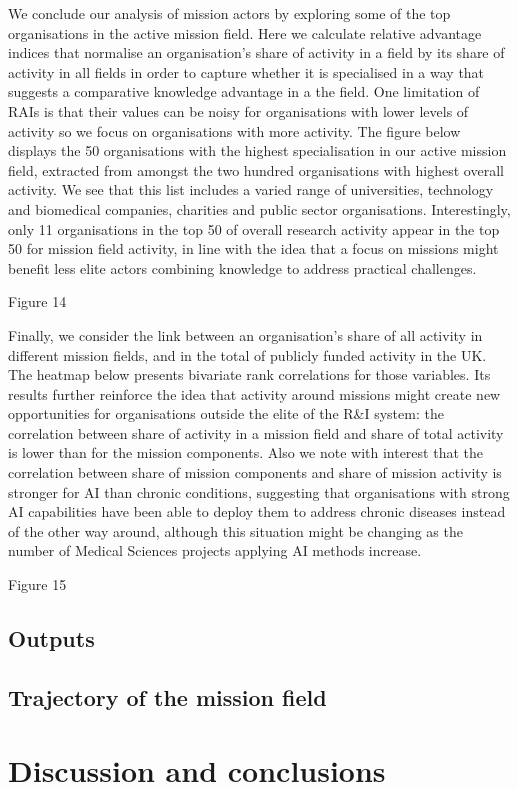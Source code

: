 \documentclass[11pt]{article}
\begin{document}
We conclude our analysis of mission actors by exploring some of the top organisations in the active mission field. Here we calculate relative advantage indices that normalise an organisation’s share of activity in a field by its share of activity in all fields in order to capture whether it is specialised in a way that suggests a comparative knowledge advantage in a the field. One limitation of RAIs is that their values can be noisy for organisations with lower levels of activity so we focus on organisations with more activity. The figure below displays the 50 organisations with the highest specialisation in our active mission field, extracted from amongst the two hundred organisations with highest overall activity. We see that this list includes a varied range of universities, technology and biomedical companies,
charities and public sector organisations. Interestingly, only 11 organisations in the top 50 of overall research activity appear in the top 50 for mission field activity, in line with the idea that a focus on missions might benefit less elite actors combining knowledge to address practical challenges.

Figure 14

Finally, we consider the link between an organisation’s share of all activity in different mission fields, and in the total of publicly funded activity in the UK. The heatmap below presents bivariate rank correlations for those variables. Its results further reinforce the idea that activity around missions might create new opportunities for organisations outside the elite of the R&I system: the correlation between share of activity in a mission field and share of total activity is lower than for the mission components. Also we note with interest that the correlation between share of mission components and share of mission activity is stronger for AI than chronic conditions, suggesting that organisations with strong AI capabilities have been able to deploy them to address chronic diseases instead of the other way around, although this situation might be changing as the number of Medical Sciences projects applying AI methods increase.

Figure 15

\subsection{Outputs}
\subsection{Trajectory of the mission field}
\label{subsec:trajectory}
\section{Discussion and conclusions}




%
\end{document}
